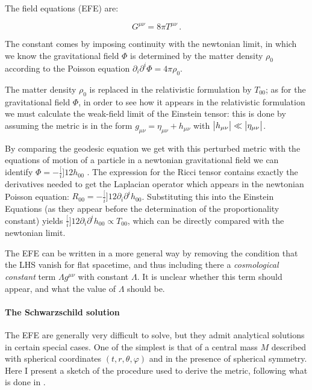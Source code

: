 \documentclass[main.tex]{subfiles}
\begin{document}
The field equations (EFE) are:

\begin{equation} \label{eq:EFE}
  G^{\mu\nu} = 8 \pi T^{\mu\nu} \,.
\end{equation}

The constant comes by imposing continuity with the newtonian limit, in which we know the gravitational field \(\Phi\) is determined by the matter density \(\rho_0\) according to the Poisson equation \(\partial_i \partial^i \Phi = 4 \pi \rho_0\).

The matter density \(\rho_0\) is replaced in the relativistic formulation by \(T_{00}\); as for the gravitational field \(\Phi\), in order to see how it appears in the relativistic formulation we must calculate the weak-field limit of the Einstein tensor: this is done by assuming the metric is in the form \(g_{\mu \nu} = \eta_{\mu\nu} + h_{\mu\nu}\) with \(\abs{h_{\mu\nu}} \ll \abs{\eta_{\mu\nu}}\).

By comparing the geodesic equation we get with this perturbed metric with the equations of motion of a particle in a newtonian gravitational field we can identify \(\Phi = -\frac[i]{1}{2} h_{00}\) \cite[eq. 4.20]{Carroll:1997ar}.
The expression for the Ricci tensor contains exactly the derivatives needed to get the Laplacian operator which appears in the newtonian Poisson equation: \(R_{00} = -\frac[i]{1}{2} \partial_i \partial^i h_{00}\). Substituting this into the Einstein Equations (as they appear before the determination of the proportionality constant) yields \(\frac[i]{1}{2} \partial_i \partial^i h_{00} \propto T_{00}\), which can be directly compared with the newtonian limit.

The EFE can be written in a more general way by removing the condition that the LHS vanish for flat spacetime, and thus including there a \emph{cosmological constant}  term \(\Lambda g^{\mu\nu}\) with constant \(\Lambda\).
It is unclear whether this term should appear, and what the value of \(\Lambda\) should be.

\paragraph{The Schwarzschild solution}


The EFE are generally very difficult to solve, but they admit analytical solutions in certain special cases.
One of the simplest is that of a central mass \(M\) described with spherical coordinates \((t, r, \theta, \varphi)\) and in the presence of spherical symmetry. Here I present a sketch of the procedure used to derive the metric, following what is done in \textcite[section 7]{Carroll:1997ar}.
\end{document}
